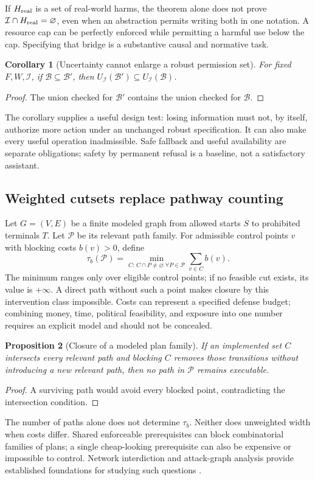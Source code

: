 \documentclass[10pt,twocolumn,letterpaper]{article}
\newtheorem{proposition}{Proposition}
\newtheorem{corollary}[proposition]{Corollary}
\newcommand{\I}{\mathcal I}
\newcommand{\B}{\mathcal B}
\begin{document}
If $H_{\rm real}$ is a set of real-world harms, the theorem alone does not prove $\I\cap H_{\rm real}=\varnothing$, even when an abstraction permits writing both in one notation. A resource cap can be perfectly enforced while permitting a harmful use below the cap. Specifying that bridge is a substantive causal and normative task.

\begin{corollary}[Uncertainty cannot enlarge a robust permission set]
For fixed $F,W,\I$, if $\B\subseteq\B'$, then $U_{\I}(\B')\subseteq U_{\I}(\B)$.
\end{corollary}
\begin{proof}
The union checked for $\B'$ contains the union checked for $\B$.
\end{proof}
The corollary supplies a useful design test: losing information must not, by itself, authorize more action under an unchanged robust specification. It can also make every useful operation inadmissible. Safe fallback and useful availability are separate obligations; safety by permanent refusal is a baseline, not a satisfactory assistant.

\subsection{Weighted cutsets replace pathway counting}
Let $G=(V,E)$ be a finite modeled graph from allowed starts $S$ to prohibited terminals $T$. Let $\mathcal P$ be its relevant path family. For admissible control points $v$ with blocking costs $b(v)>0$, define
\begin{equation}
\tau_b(\mathcal P)=
\min_{C:\, C\cap P\ne\varnothing\;\forall P\in\mathcal P}
\sum_{v\in C}b(v).
\label{eq:weightedcut}
\end{equation}
The minimum ranges only over eligible control points; if no feasible cut exists, its value is $+\infty$. A direct path without such a point makes closure by this intervention class impossible. Costs can represent a specified defense budget; combining money, time, political feasibility, and exposure into one number requires an explicit model and should not be concealed.

\begin{proposition}[Closure of a modeled plan family]
If an implemented set $C$ intersects every relevant path and blocking $C$ removes those transitions without introducing a new relevant path, then no path in $\mathcal P$ remains executable.
\end{proposition}
\begin{proof}
A surviving path would avoid every blocked point, contradicting the intersection condition.
\end{proof}
The number of paths alone does not determine $\tau_b$. Neither does unweighted width when costs differ. Shared enforceable prerequisites can block combinatorial families of plans; a single cheap-looking prerequisite can also be expensive or impossible to control. Network interdiction and attack-graph analysis provide established foundations for studying such questions \cite{interdiction,sheyner}.
\end{document}

